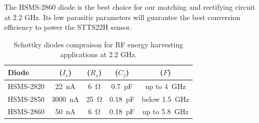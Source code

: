 The HSMS-2860 diode is the best choice for our matching and rectifying circuit at 2.2 GHz. 
Its low parasitic parameters will guarantee the best conversion efficiency to power the STTS22H sensor.

\begin{table}[h]
    \centering
    \caption{Schottky diodes compraison for RF energy harvesting applications at 2.2 GHz.}
    \label{tab:diodes_comparison}
    \begin{tabular}{lcccc}
        \toprule
        \textbf{Diode} & \textbf{($I_s$)} & \textbf{($R_s$)} & \textbf{($C_j$)} & \textbf{($F$)}\\
        \midrule
        HSMS-2820 & \SI{22}{\nano\ampere} & \SI{6}{\ohm} & \SI{0.7}{\pico\farad} & up to \SI{4}{\giga\hertz} \\
         HSMS-2850 & \SI{3000}{\nano\ampere} & \SI{25}{\ohm} & \SI{0.18}{\pico\farad} & below \SI{1.5}{\giga\hertz} \\
        HSMS-2860   & \SI{50}{\nano\ampere} & \SI{6}{\ohm} & \SI{0.18}{\pico\farad} & up to \SI{5.8}{\giga\hertz} \\
        \bottomrule
    \end{tabular}
\end{table}